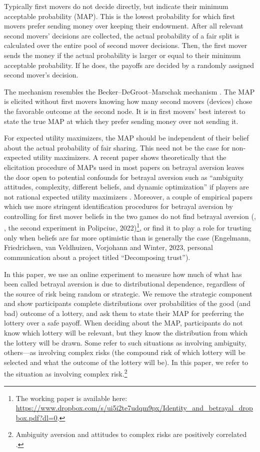 \documentclass[pdftex,12pt, a4paper]{article}
\begin{document}
Typically first movers do not decide directly, but indicate their minimum acceptable probability (MAP).
This is the lowest probability for which first movers prefer sending money over keeping their endowment.
After all relevant second movers' decisions are collected, the actual probability of a fair split is calculated over the entire pool of second mover decisions.
Then, the first mover sends the money if the actual probability is larger or equal to their minimum acceptable probability.
If he does, the payoffs are decided by a randomly assigned second mover's decision.

The mechanism resembles the Becker--DeGroot--Marschak mechanism \citep[in short, BDM]{Becker1964}.
The MAP is elicited without first movers knowing how many second movers (devices) chose the favorable outcome at the second node.
It is in first movers' best interest to state the true MAP at which they prefer sending money over not sending it.

For expected utility maximizers, the MAP should be independent of their belief about the actual probability of fair sharing.
This need not be the case for non-expected utility maximizers.
A recent paper shows theoretically that the elicitation procedure of MAPs used in most papers on betrayal aversion leaves the door open to potential confounds for betrayal aversion such as ``ambiguity attitudes, complexity, different beliefs, and dynamic optimization'' if players are not rational expected utility maximizers \citep{Li2020a}.
Moreover, a couple of empirical papers which use more stringent identification procedures for betrayal aversion by controlling for first mover beliefs in the two games do not find betrayal aversion (\citeauthor{Fetchenhauer2012}, \citeyear{Fetchenhauer2012}, the second experiment in Polipciuc, 2022)\footnote{
The working paper is available here: \url{https://www.dropbox.com/s/ui5i2te7udqm9px/Identity_and_betrayal_dropbox.pdf?dl=0}.
}, or find it to play a role for trusting only when beliefs are far more optimistic than is generally the case (Engelmann, Friedrichsen, van Veldhuizen, Vorjohann and Winter, 2023, personal communication about a project titled ``Decomposing trust'').

In this paper, we use an online experiment to measure how much of what has been called betrayal aversion is due to distributional dependence, regardless of the source of risk being random or strategic.
We remove the strategic component and show participants complete distributions over probabilities of the good (and bad) outcome of a lottery, and ask them to state their MAP for preferring the lottery over a safe payoff.
When deciding about the MAP, participants do not know which lottery will be relevant, but they know the distribution from which the lottery will be drawn.
Some refer to such situations as involving ambiguity, others---as involving complex risks (the compound risk of which lottery will be selected and what the outcome of the lottery will be).
In this paper, we refer to the situation as involving complex risk.\footnote{
Ambiguity aversion and attitudes to complex risks are positively correlated \citep{Armantier2016}.
}
\end{document}
